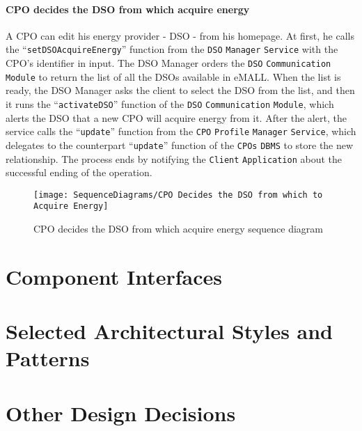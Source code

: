 \paragraph{CPO decides the DSO from which acquire energy}
A CPO can edit his energy provider - DSO - from his homepage.
At first, he calls the ``\verb|setDSOAcquireEnergy|'' function from the \verb|DSO| \verb|Manager| \verb|Service| with the CPO's identifier in input.
The DSO Manager orders the \verb|DSO| \verb|Communication| \verb|Module| to return the list of all the DSOs available in eMALL\@.
When the list is ready, the DSO Manager asks the client to select the DSO from the list, and then it runs the ``\verb|activateDSO|'' function of the \verb|DSO| \verb|Communication| \verb|Module|, which alerts the DSO that a new CPO will acquire energy from it.
After the alert, the service calls the ``\verb|update|'' function from the \verb|CPO| \verb|Profile| \verb|Manager| \verb|Service|, which delegates to the counterpart ``\verb|update|'' function of the \verb|CPOs| \verb|DBMS| to store the new relationship.
The process ends by notifying the \verb|Client| \verb|Application| about the successful ending of the operation.
\begin{figure}[H]
    \begin{center}
        \texttt{[image: SequenceDiagrams/CPO Decides the DSO from which to Acquire Energy]}
        \caption{CPO decides the DSO from which acquire energy sequence diagram}
        \label{cpo_decides_dso_from_which_acquire_energy}
    \end{center}
\end{figure}


\section{Component Interfaces}
\label{sec: component_interfaces}%


\section{Selected Architectural Styles and Patterns}
\label{sec: patterns}%


\section{Other Design Decisions}
\label{sec: other_design_decisions}%
